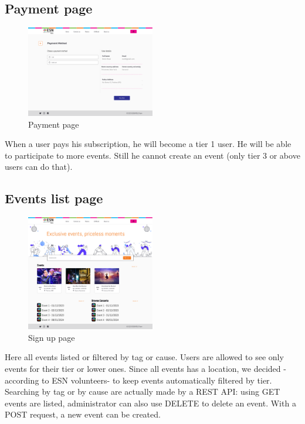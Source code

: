 \subsection{Payment page}
\begin{figure}[H]
    \centering
    \includegraphics[width=0.5\textwidth]{images/PaymentMethod.png}
    \caption{Payment page}
    \label{fig:payment}
\end{figure}
When a user pays his subscription, he will become a tier 1 user. He will be able to participate to more
events. Still he cannot create an event (only tier 3 or above users can do that). 
\subsection{Events list page}
\begin{figure}[H]
    \centering
    \includegraphics[width=0.5\textwidth]{images/EventList.png}
    \caption{Sign up page}
    \label{fig:events}
\end{figure}
Here all events listed or filtered by tag or cause. Users are allowed to see only events for their tier
or lower ones. Since all events has a location, we decided -according to ESN volunteers- to keep
events automatically filtered by tier.\\
Searching by tag or by cause are actually made by a REST API: using GET events are listed, administrator
can also use DELETE to delete an event. With a POST request, a new event can be created.\\
